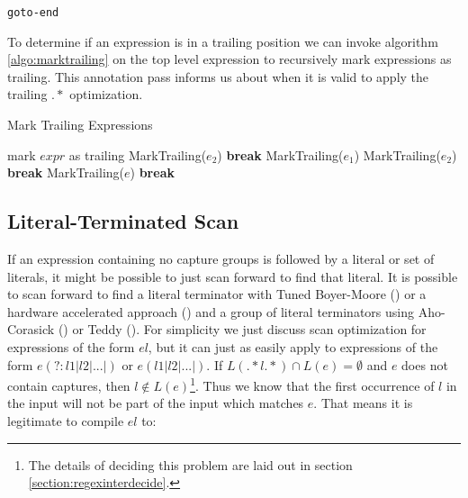 \begin{verbatim}
goto-end
\end{verbatim}

To determine if an expression is in a trailing position we can 
invoke algorithm \ref{algo:marktrailing} on the top level expression
to recursively mark expressions as trailing. This annotation pass
informs us about when it is valid to apply the trailing $.*$ optimization.

\begin{algorithm}
\caption{Mark Trailing Expressions} \label{algo:marktrailing}
\begin{algorithmic}
  \State mark $expr$ as trailing
      \State MarkTrailing($e_2$)
      \State \textbf{break}
    \EndCase
      \State MarkTrailing($e_1$)
      \State MarkTrailing($e_2$)
      \State \textbf{break}
    \EndCase
    \EndCase
    \EndCase
    \EndCase
    \EndCase
      \State MarkTrailing($e$)
      \State \textbf{break}
    \EndCase
    \Case{$\epsilon$}
    \EndCase
    \Case{$\alpha$}
    \EndCase
    \EndCase
  \EndSwitch

\EndProcedure
\end{algorithmic}
\end{algorithm}

\subsection{Literal-Terminated Scan}
\label{section:littermscan}

If an expression containing no capture groups is followed by a
literal or set of literals, it might be possible to just scan forward
to find that literal. It is possible to scan forward to find a literal
terminator with Tuned Boyer-Moore (\cite{Hume1991}) or a hardware
accelerated approach (\cite{GallantRegex}) and a group of literal
terminators using Aho-Corasick (\cite{Aho1975}) or Teddy (\cite{Teddy}).
For simplicity we just discuss scan optimization for expressions of
the form $el$, but it can just as easily apply to expressions of the
form $e(?:l1|l2|...|)$ or $e(l1|l2|...|)$.
If $L(.*l.*) \cap L(e) = \emptyset$ and $e$ does
not contain captures, then $l \not\in L(e)$\footnote{The details of deciding
this problem are laid out in section \ref{section:regexinterdecide}.}.
Thus we know that the first occurrence of $l$
in the input will not be part of the input which matches $e$. That means
it is legitimate to compile $el$ to:

